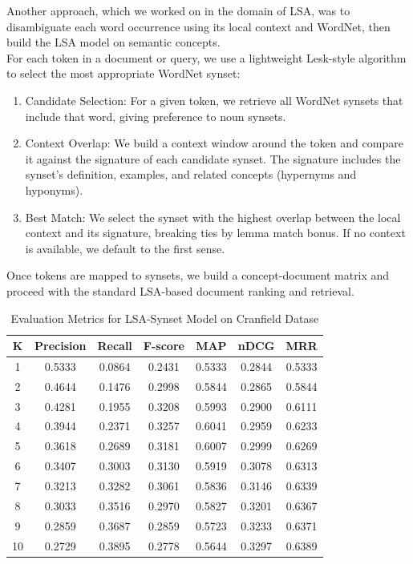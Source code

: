 \documentclass{article}
\begin{document}
Another approach, which we worked on in the domain of LSA, was to disambiguate each word occurrence using its local context and WordNet, then build the LSA model on semantic concepts.\\
For each token in a document or query, we use a lightweight Lesk-style algorithm to select the most appropriate WordNet synset:
\begin{enumerate}
    \item Candidate Selection: For a given token, we retrieve all WordNet synsets that include that word, giving preference to noun synsets.
    \item Context Overlap: We build a context window around the token and compare it against the signature of each candidate synset. The signature includes the synset's definition, examples, and related concepts (hypernyms and hyponyms).
    \item Best Match: We select the synset with the highest overlap between the local context and its signature, breaking ties by lemma match bonus. If no context is available, we default to the first sense.
\end{enumerate}
Once tokens are mapped to synsets, we build a concept-document matrix and proceed with the standard LSA-based document ranking and retrieval.

\begin{table}[ht]
\centering
\begin{tabular}{|c|c|c|c|c|c|c|}
\hline
K & Precision & Recall & F-score & MAP & nDCG & MRR \\ \hline
1  & 0.5333 & 0.0864 & 0.2431 & 0.5333 & 0.2844 & 0.5333 \\ \hline
2  & 0.4644 & 0.1476 & 0.2998 & 0.5844 & 0.2865 & 0.5844 \\ \hline
3  & 0.4281 & 0.1955 & 0.3208 & 0.5993 & 0.2900 & 0.6111 \\ \hline
4  & 0.3944 & 0.2371 & 0.3257 & 0.6041 & 0.2959 & 0.6233 \\ \hline
5  & 0.3618 & 0.2689 & 0.3181 & 0.6007 & 0.2999 & 0.6269 \\ \hline
6  & 0.3407 & 0.3003 & 0.3130 & 0.5919 & 0.3078 & 0.6313 \\ \hline
7  & 0.3213 & 0.3282 & 0.3061 & 0.5836 & 0.3146 & 0.6339 \\ \hline
8  & 0.3033 & 0.3516 & 0.2970 & 0.5827 & 0.3201 & 0.6367 \\ \hline
9  & 0.2859 & 0.3687 & 0.2859 & 0.5723 & 0.3233 & 0.6371 \\ \hline
10 & 0.2729 & 0.3895 & 0.2778 & 0.5644 & 0.3297 & 0.6389 \\ \hline
\end{tabular}
\caption{Evaluation Metrics for LSA-Synset Model on Cranfield Datase}
\label{tab:metrics}
\end{table}
\end{document}
